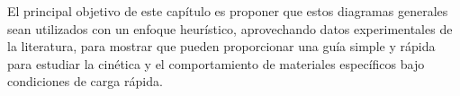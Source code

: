\begin{table}[h!]
    \centering
    \caption{Ejemplo de dos materiales, A y B, caracterizados por sus coeficientes 
    de difusión, sus constantes cinéticas y sus tamaños.}
    \setlength\extrarowheight{2pt}
    \label{t:ab}
\end{table}

El principal objetivo de este capítulo es proponer que estos diagramas generales 
sean utilizados con un enfoque heurístico, aprovechando datos experimentales de la
literatura, para mostrar que pueden proporcionar una guía simple y rápida para 
estudiar la cinética y el comportamiento de materiales específicos bajo 
condiciones de carga rápida.
